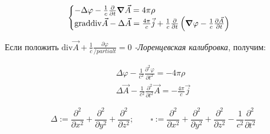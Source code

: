 \[
\begin{cases}
    -\Delta\varphi-\frac{1}{c}\frac{\partial}{\partial t}\grad \vec{A}=4\pi\rho \\
    \mathrm{grad div }\vec{A}-\Delta \vec{A} =\frac{4\pi}{c}\vec{j}+\frac{1}{c}  \frac{\partial }{\partial t} \left( \grad\varphi -\frac{1}{c} \frac{\partial \vec{A}}{\partial t}  \right)   
\end{cases}
\]

Если положить \( \mathrm{div}\vec{A}+\frac{1}{c} \frac{\partial\varphi}{/partial t}=0    \) \textit{-Лоренцевская калибровка}, получим:

\begin{gather*}
    \Delta\varphi-\frac{1}{c^2} \frac{\partial^2\varphi}{\partial t^2} =-4\pi\rho \\
    \Delta\vec{A}-\frac{1}{c^2} \frac{\partial^2}{\partial t^2}\vec{A}=-\frac{4\pi}{c}\vec{j}    
\end{gather*}

\[
\Delta:= \frac{\partial^2}{\partial x^2}+\frac{\partial^2}{\partial y^2} +\frac{\partial^2}{\partial z^2} ;\qquad \square :=\frac{\partial^2}{\partial x^2}+\frac{\partial^2}{\partial y^2} +\frac{\partial^2}{\partial z^2}-\frac{1}{c^2} \frac{\partial^2}{\partial t^2}
\]